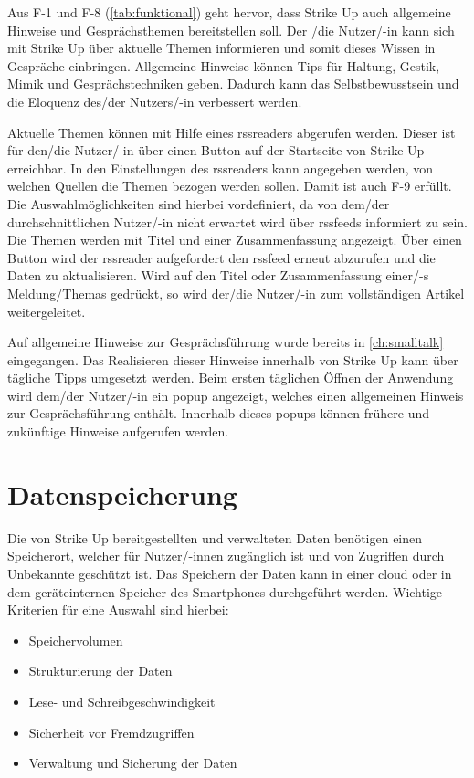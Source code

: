 Aus F-1 und F-8 (\ref{tab:funktional}) geht hervor, dass Strike Up auch allgemeine Hinweise und Gesprächsthemen bereitstellen soll. Der /die Nutzer/-in kann sich mit Strike Up
über aktuelle Themen informieren und somit dieses Wissen in Gespräche einbringen. \newline
Allgemeine Hinweise können Tips für Haltung, Gestik, Mimik und Gesprächstechniken geben. Dadurch kann das Selbstbewusstsein und die Eloquenz des/der Nutzers/-in verbessert
werden.

Aktuelle Themen können mit Hilfe eines \gls{rssreader}s abgerufen werden. Dieser ist für den/die Nutzer/-in über einen Button auf der Startseite von Strike Up erreichbar. In den
Einstellungen des \gls{rssreader}s kann angegeben werden, von welchen Quellen die Themen bezogen werden sollen. Damit ist auch F-9 erfüllt. Die Auswahlmöglichkeiten sind hierbei vordefiniert,
da von dem/der durchschnittlichen Nutzer/-in nicht erwartet wird über \gls{rssfeed}s informiert zu sein. \newline
Die Themen werden mit Titel und einer Zusammenfassung angezeigt. Über einen Button wird der \gls{rssreader} aufgefordert den \gls{rssfeed} erneut abzurufen und die Daten zu aktualisieren.
Wird auf den Titel oder Zusammenfassung einer/-s Meldung/Themas gedrückt, so wird der/die Nutzer/-in zum vollständigen Artikel weitergeleitet.

Auf allgemeine Hinweise zur Gesprächsführung wurde bereits in \ref{ch:smalltalk} eingegangen. Das Realisieren dieser Hinweise innerhalb von Strike Up kann über tägliche Tipps umgesetzt werden.
Beim ersten täglichen Öffnen der Anwendung wird dem/der Nutzer/-in ein \gls{popup} angezeigt, welches einen allgemeinen Hinweis zur Gesprächsführung enthält. Innerhalb dieses \glspl{popup}
können frühere und zukünftige Hinweise aufgerufen werden.

\section{Datenspeicherung}
\label{sec:datenspeicherung}

Die von Strike Up bereitgestellten und verwalteten Daten benötigen einen Speicherort, welcher für Nutzer/-innen zugänglich ist und von Zugriffen durch Unbekannte geschützt ist.
Das Speichern der Daten kann in einer \gls{cloud} oder in dem geräteinternen Speicher des Smartphones durchgeführt werden. \newline
Wichtige Kriterien für eine Auswahl sind hierbei:
\begin{itemize}
    \item Speichervolumen
    \item Strukturierung der Daten
    \item Lese- und Schreibgeschwindigkeit
    \item Sicherheit vor Fremdzugriffen
    \item Verwaltung und Sicherung der Daten
\end{itemize}

